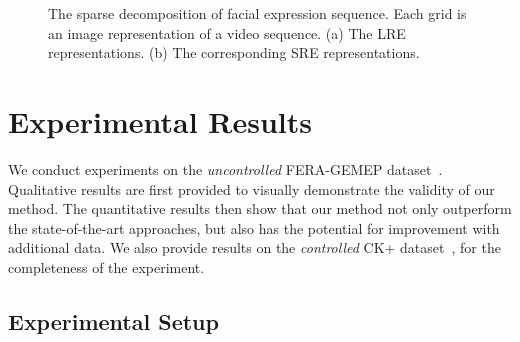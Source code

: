 \documentclass[journal]{IEEEtran}
\begin{document}
\begin{figure}[htbp]
\caption{\label{fig:rep_vs_id} The sparse decomposition of facial expression sequence. Each grid is an image representation of a video sequence. (a) The LRE representations. (b) The corresponding SRE representations.}
\end{figure}

\section{Experimental Results\label{sec:exp}}

We conduct experiments on the \textit{uncontrolled} FERA-GEMEP dataset~\cite{FERA_data}. Qualitative results are first provided to visually demonstrate the validity of our method. The quantitative results then show that our method not only outperform the state-of-the-art approaches, but also has the potential for improvement with additional data. We also provide results on the \textit{controlled} CK+ dataset~\cite{CKplus}, for the completeness of the experiment.

\subsection{Experimental Setup}
\end{document}
